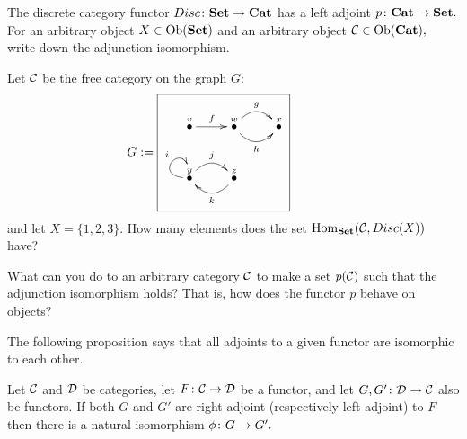 \documentclass[../main/CT4S-EN-RU]{subfiles}
\begin{document}
\begin{exerciseRUS}
\end{exerciseRUS}

\begin{exerciseENG}
The discrete category functor $Disc\colon{\mathbf{Set}}\rightarrow{\mathbf{Cat}}$ has a left adjoint $p\colon{\mathbf{Cat}}\rightarrow{\mathbf{Set}}.$ 
\sexc For an arbitrary object $X\in\operatorname{Ob}({\mathbf{Set}})$ and an arbitrary object $\mathcal{C}\in\operatorname{Ob}({\mathbf{Cat}}),$ write down the adjunction isomorphism.
\item Let $\mathcal{C}$ be the free category on the graph $G$:
$$
G:=\parbox{2in}{\fbox{\xymatrix{\LMO{v}\ar[r]^f&\LMO{w}\ar@/_1pc/[r]_h\ar@/^1pc/[r]^g&\LMO{x}\\\LMO{y}\ar@(l,u)[]^i\ar@/^1pc/[r]^j&\LMO{z}\ar@/^1pc/[l]^k}}}
$$
and let $X=\{1,2,3\}.$ How many elements does the set $\operatorname{Hom}_{\mathbf{Set}}(\mathcal{C},Disc(X))$ have?
\item What can you do to an arbitrary category $\mathcal{C}$ to make a set $p(\mathcal{C})$ such that the adjunction isomorphism holds? That is, how does the functor $p$ behave on objects?
\endsexc
\end{exerciseENG}

\begin{exerciseRUS}
\end{exerciseRUS}

\begin{blockENG}
The following proposition says that all adjoints to a given functor are isomorphic to each other. 
\end{blockENG}

\begin{blockRUS}
\end{blockRUS}

\begin{propositionENG}\label{prop:unicity of adjoints}
Let $\mathcal{C}$ and $\mathcal{D}$ be categories, let $F\colon\mathcal{C}\rightarrow\mathcal{D}$ be a functor, and let $G,G'\colon\mathcal{D}\rightarrow\mathcal{C}$ also be functors. If both $G$ and $G'$ are right adjoint (respectively left adjoint) to $F$ then there is a natural isomorphism $\phi\colon G\rightarrow G'.$
\end{propositionENG}

\begin{propositionRUS}\label{prop:unicity of adjoints}
\end{propositionRUS}
\end{document}
